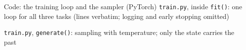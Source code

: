 \documentclass[aspectratio=169,10pt]{beamer}
\begin{document}
\begin{frame}[fragile]{Code: the training loop and the sampler (PyTorch)}
\vspace{-1mm}
{\footnotesize \texttt{train.py}, inside \texttt{fit()}: one loop for all three tasks (lines verbatim; logging and early stopping omitted)}

\vspace{0.5mm}
{\footnotesize \texttt{train.py}, \texttt{generate()}: sampling with temperature; only the state carries the past}

\vspace{-0.5mm}
\end{frame}
\end{document}
